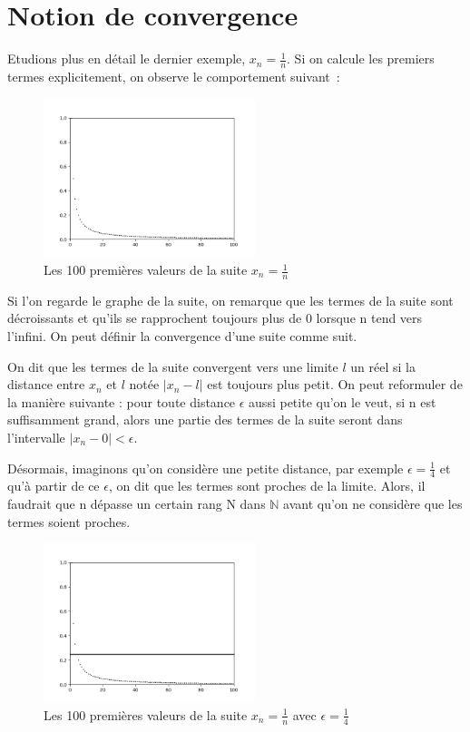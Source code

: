 \section{Notion de convergence}

Etudions plus en détail le dernier exemple, $x_n = \frac{1}{n}$. Si on calcule les premiers termes explicitement, on observe le comportement suivant~: 

\begin{figure}[H]
\centering \includegraphics[width = 0.55\textwidth]{./assets/imgs/1_sur_n.png}
\caption{Les 100 premières valeurs de la suite $x_n = \frac{1}{n}$}
\label{fig:1_sur_n}
\end{figure}

Si l'on regarde le graphe de la suite, on remarque que les termes de la suite sont décroissants et qu'ils se rapprochent toujours plus de $0$ lorsque n tend vers l'infini.
On peut définir la convergence d'une suite comme suit.

On dit que les termes de la suite convergent vers une limite $l$ un réel si la distance entre $x_n$ et $l$ notée $\lvert x_n - l \rvert$ est toujours plus petit. On peut reformuler de la manière suivante :
pour toute distance $\epsilon$ aussi petite qu'on le veut, si n est suffisamment grand, alors une partie des termes de la suite seront dans l'intervalle $\lvert x_n - 0 \rvert < \epsilon$.

Désormais, imaginons qu'on considère une petite distance, par exemple $\epsilon = \frac{1}{4}$ et qu’à partir de ce $\epsilon$, on dit que les termes sont proches de la limite. Alors, il faudrait que n dépasse un certain rang N dans $\mathbb{N}$ avant qu’on ne considère que les termes soient proches.


\begin{figure}[H]
\centering \includegraphics[width = 0.55\textwidth]{./assets/imgs/1_sur_n(1)_avec_trait.png}
\caption{Les 100 premières valeurs de la suite $x_n = \frac{1}{n}$  avec $\epsilon = \frac{1}{4}$}
\label{fig:1_sur_n_avec_trait}
\end{figure}


